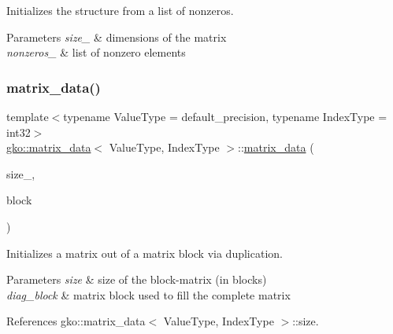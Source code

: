 Initializes the structure from a list of nonzeros. 


\begin{DoxyParams}{Parameters}
{\em size\+\_\+} & dimensions of the matrix \\
\hline
{\em nonzeros\+\_\+} & list of nonzero elements \\
\hline
\end{DoxyParams}
\mbox{\label{structgko_1_1matrix__data_aa8398ce720b3db2ebde137419d032352}} 
\subsubsection{\texorpdfstring{matrix\+\_\+data()}{matrix\_data()}\hspace{0.1cm}{\footnotesize\ttfamily [5/6]}}
{\footnotesize\ttfamily template$<$typename Value\+Type = default\+\_\+precision, typename Index\+Type = int32$>$ \\
\hyperlink{structgko_1_1matrix__data}{gko\+::matrix\+\_\+data}$<$ Value\+Type, Index\+Type $>$\+::\hyperlink{structgko_1_1matrix__data}{matrix\+\_\+data} (\begin{DoxyParamCaption}\item[{\hyperlink{structgko_1_1dim}{dim}$<$ 2 $>$}]{size\+\_\+,  }\item[{const \hyperlink{structgko_1_1matrix__data}{matrix\+\_\+data}$<$ Value\+Type, Index\+Type $>$ \&}]{block }\end{DoxyParamCaption})\hspace{0.3cm}{\ttfamily [inline]}}



Initializes a matrix out of a matrix block via duplication. 


\begin{DoxyParams}{Parameters}
{\em size} & size of the block-\/matrix (in blocks) \\
\hline
{\em diag\+\_\+block} & matrix block used to fill the complete matrix \\
\hline
\end{DoxyParams}


References gko\+::matrix\+\_\+data$<$ Value\+Type, Index\+Type $>$\+::size.

\mbox{\label{structgko_1_1matrix__data_a380d2b8207621f3c997804afa6d729af}} 

